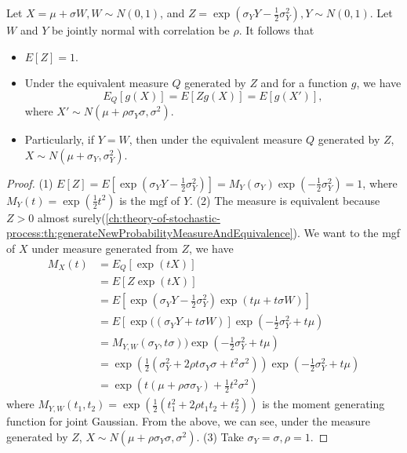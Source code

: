 \begin{refsection}
\begin{theorem}\label{ch:theory-of-stochastic-process:th:changeOfMeasureGaussianRandomVariable}
	Let $X = \mu + \sigma W, W\sim N(0,1)$, and $Z = \exp(\sigma_YY - \frac{1}{2}\sigma_Y^2),Y\sim N(0,1)$. Let $W$ and $Y$ be jointly normal with correlation be $\rho$.
	It follows that
	\begin{itemize}
		\item $E[Z] = 1$.
		\item Under the equivalent measure $Q$ generated by $Z$ and for a  function $g$, we have
		$$E_Q[g(X)] = E[Zg(X)] = E[g(X')],$$
		where $X' \sim N(\mu + \rho \sigma_Y\sigma,\sigma^2)$.
		\item Particularly, if $Y = W$, then under the equivalent measure $Q$ generated by $Z$, $X\sim N(\mu + \sigma_Y,\sigma_Y^2)$.
	\end{itemize}
\end{theorem}
\begin{proof}
	(1) $E[Z] = E[\exp(\sigma_YY - \frac{1}{2}\sigma_Y^2)] = M_Y(\sigma_Y)\exp(-\frac{1}{2}\sigma_Y^2) = 1$,
	where $M_Y(t) = \exp(\frac{1}{2}t^2)$ is the mgf of $Y$.
	(2)
	The measure is equivalent because $Z > 0$ almost surely(\autoref{ch:theory-of-stochastic-process:th:generateNewProbabilityMeasureAndEquivalence}).
	We want to the mgf of $X$ under measure generated from $Z$, we have
	\begin{align*}
	M_X(t) &= E_Q[\exp(tX)] \\
	&= E[Z\exp(tX)] \\
	&=E[\exp(\sigma_YY - \frac{1}{2}\sigma_Y^2) \exp(t\mu + t\sigma W)] \\
	&= E[\exp((\sigma_Y Y + t\sigma W)]\exp( - \frac{1}{2}\sigma_Y^2 + t\mu)\\
	&= M_{Y,W}(\sigma_Y, t\sigma))\exp( - \frac{1}{2}\sigma_Y^2 + t\mu)\\
	&= \exp(\frac{1}{2}(\sigma_Y^2 + 2\rho t\sigma_Y\sigma +t^2\sigma^2))\exp( - \frac{1}{2}\sigma_Y^2 + t\mu)\\
	&=\exp(t(\mu + \rho\sigma\sigma_Y) + \frac{1}{2}t^2\sigma^2)
	\end{align*}
	where $M_{Y,W}(t_1,t_2) = \exp(\frac{1}{2}(t_1^2+2\rho t_1t_2 +t_2^2))$ is the moment generating function for joint Gaussian. From the above, we can see, under the measure generated by $Z$, $X\sim N(\mu + \rho\sigma_Y\sigma,\sigma^2)$.
	(3) Take $\sigma_Y = \sigma, \rho = 1$.
\end{proof}




\end{refsection}
